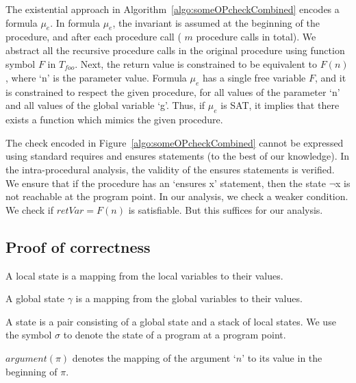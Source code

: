 \documentclass{llncs}
\newcommand{\foo}{\textit{foo}}
\newcommand{\trace}{\pi}
\newcommand{\pathCondition}{\mathit{T_{\foo}}}
\newcommand{\retVar}{\textit{retVar}}
\newcommand{\F}{\mathit{F}}
\newcommand{\n}{\textit{n}}
\newcommand{\gstate}{\gamma}
\newcommand{\formula}{\mu}
\newcommand{\param}[1]{\mathit{argument(#1)}}
\newcommand{\state}{\sigma}
\begin{document}
The existential approach in Algorithm~\ref{algo:someOPcheckCombined}
encodes a formula $\formula_e$. In formula $\formula_e$, the invariant
is assumed at the beginning of the procedure, and after each procedure
call ( $m$ procedure calls in total).  We abstract all the recursive
procedure calls in the original procedure using function symbol $\F$
in $\pathCondition$.  Next, the return value is constrained to be
equivalent to $\F(n)$, where `n' is the parameter value. Formula
$\formula_e$ has a single free variable $\F$, and it is constrained to
respect the given procedure, for all values of the parameter `n' and
all values of the global variable `g'. Thus, if $\formula_e$ is SAT,
it implies that there exists a function which mimics the given
procedure. 

The check encoded in Figure~\ref{algo:someOPcheckCombined} cannot be
expressed using standard requires and ensures statements (to the best
of our knowledge). In the intra-procedural analysis, the validity of
the ensures statements is verified. We ensure that if the procedure
has an `ensures x' statement, then the state $\neg$x is not reachable
at the program point.  In our analysis, we check a weaker
condition. We check if $\retVar = \F(n)$ is satisfiable. But this
suffices for our analysis.

\subsection{Proof of correctness}
\begin{definition}
  A local state is a mapping from the local variables to their
  values. 
\end{definition}

\begin{definition}
  A global state $\gstate$ is a mapping from the global variables to
  their values.
\end{definition}

\begin{definition}[state]
  A state is a pair consisting of a global state and a stack of local
  states. We use the symbol $\state$ to denote the state of a program
  at a program point.
\end{definition}

\begin{definition}
  $\param{\trace}$ denotes the mapping of the argument `$\n$' to its
  value in the beginning of $\trace$.
\end{definition}
\end{document}
